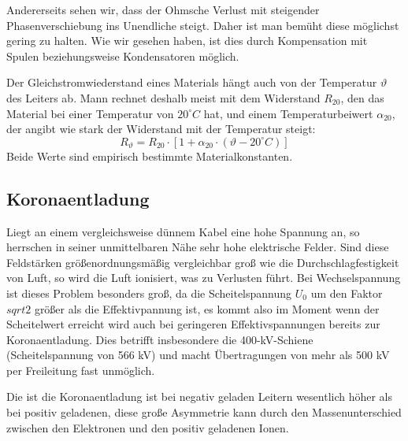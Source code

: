 Andererseits sehen wir, dass der Ohmsche Verlust mit steigender Phasenverschiebung ins Unendliche steigt. Daher ist man bemüht diese möglichst gering zu halten. Wie wir gesehen haben, ist dies durch Kompensation mit Spulen beziehungsweise Kondensatoren möglich.

Der Gleichstromwiederstand eines Materials hängt auch von der Temperatur $\vartheta$ des Leiters ab. Mann rechnet deshalb meist mit dem Widerstand $R_{20}$, den das Material bei einer Temperatur von $20^\circ C$ hat, und einem Temperaturbeiwert $\alpha_{20}$, der angibt wie stark der Widerstand mit der Temperatur steigt:
\begin{equation}
R_\vartheta = R_{20} \cdot \left[ 1 + \alpha_{20} \cdot \left( \vartheta - 20^\circ C \right) \right]
\end{equation}
Beide Werte sind empirisch bestimmte Materialkonstanten.



\subsection{Koronaentladung}
Liegt an einem vergleichsweise dünnem Kabel eine hohe Spannung an, so herrschen in seiner unmittelbaren Nähe sehr hohe elektrische Felder. Sind diese Feldstärken größenordnungsmäßig vergleichbar groß wie die Durchschlagfestigkeit von Luft, so wird die Luft ionisiert, was zu Verlusten führt. Bei Wechselspannung ist dieses Problem besonders groß, da die Scheitelspannung $U_0$ um den Faktor $sqrt{2}$ größer als die Effektivpannung ist, es kommt also im Moment wenn der Scheitelwert erreicht wird auch bei geringeren Effektivspannungen bereits zur Koronaentladung. Dies betrifft insbesondere die 400-kV-Schiene (Scheitelspannung von 566 kV) und macht Übertragungen von mehr als 500 kV per Freileitung fast unmöglich.

Die ist die Koronaentladung ist bei negativ geladen Leitern wesentlich höher als bei positiv geladenen\cite{Padiyar}, diese große Asymmetrie kann durch den Massenunterschied zwischen den Elektronen und den positiv geladenen Ionen. %